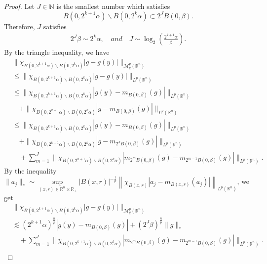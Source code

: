 \documentclass[11pt,a4]{article}
\numberwithin{equation}{section}
\theoremstyle{definition}
\theoremstyle{remark}
\begin{document}
\begin{proof}
Let $J \in \mathbb N$ is the smallest number which satisfies
	\[
		B(0,2^{k+1}\alpha) \backslash B(0,2^k\alpha) \subset 2^JB(0,\beta).
	\] 
Therefore, $J$ satisfies  
	\begin{align}
		2^J \beta \sim 2^k \alpha, \quad and \quad J \sim  \log_2\left(\frac{2^{k+1}\alpha}{\beta} \right). \label{123}
	\end{align}
By the triangle inequality, we have 
	\begin{align*}
		&\| \chi_{B(0,2^{k+1}\alpha) \backslash B(0,2^k\alpha)} |g-g(y)| \|_{{\mathcal M}{}^p_q({\mathbb R}^n)}\\
		&\le \| \chi_{B(0,2^{k+1}\alpha) \backslash B(0,2^k\alpha)} |g-g(y)| \|_{L^p({\mathbb R}^n)}\\
		&\le \| \chi_{B(0,2^{k+1}\alpha) \backslash B(0,2^k\alpha)} |g(y)-m_{B(0,\beta)}(g)| \|_{L^p({\mathbb R}^n)}\\
			&\quad+ \| \chi_{B(0,2^{k+1}\alpha) \backslash B(0,2^k\alpha)} |g-m_{B(0,\beta)}(g)| \|_{L^p({\mathbb R}^n)}\\
		&\le \| \chi_{B(0,2^{k+1}\alpha) \backslash B(0,2^k\alpha)} |g(y)-m_{B(0,\beta)}(g)| \|_{L^p({\mathbb R}^n)}\\
			& \quad + \| \chi_{B(0,2^{k+1}\alpha) \backslash B(0,2^k\alpha)} |g-m_{2^JB(0,\beta)}(g)| \|_{L^p({\mathbb R}^n)} \\
			& \quad + \sum_{m=1}^{J} \| \chi_{B(0,2^{k+1}\alpha) \backslash B(0,2^k\alpha)} |m_{2^mB(0,\beta)}(g)-m_{2^{m-1}B(0,\beta)}(g)| \|_{L^p({\mathbb R}^n)}.
	\end{align*}
By the inequality $\|a_j\|_* \sim \sup\limits_{(x,r) \in {\mathbb R}^{n} \times \mathbb{R}_+} |B(x,r)|^{-\frac{1}{p} } \left\| \chi_{B(x,r)}|a_j-m_{B(x,r)}(a_j)| \right\|_{L^p({\mathbb R}^n)}$, we get
	\begin{align*}
		&\| \chi_{B(0,2^{k+1}\alpha) \backslash B(0,2^k\alpha)} |g-g(y)| \|_{{\mathcal M}{}^p_q({\mathbb R}^n)}\\
		&\lesssim (2^{k+1}\alpha)^{\frac{n}{p}} |g(y)-m_{B(0,\beta)}(g)| + (2^J\beta)^{\frac{n}{p}} \|g\|_*\\
			& \quad + \sum_{m=1}^{J} \| \chi_{B(0,2^{k+1}\alpha) \backslash B(0,2^k\alpha)} |m_{2^mB(0,\beta)}(g)-m_{2^{m-1}B(0,\beta)}(g)| \|_{L^p({\mathbb R}^n)}.\\
	\end{align*}

\end{proof}
\end{document}
